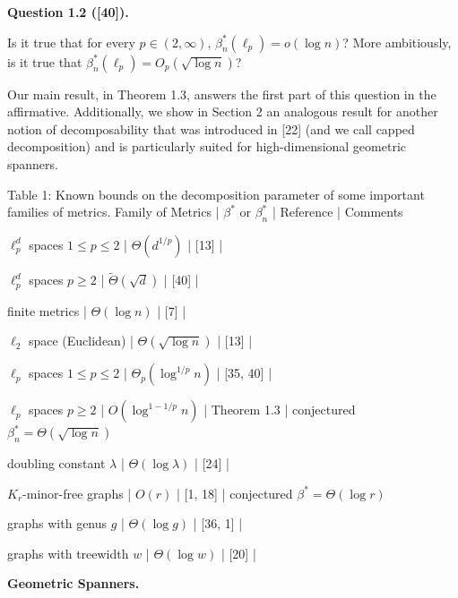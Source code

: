 \par
\par
\par\medskip\noindent\textbf{Question 1.2 ([40]).}\par
Is it true that for every $p\in(2,\infty)$, $\beta^{*}_{n}(\ell_{p})=o(\log{n})$? More ambitiously, is it true that $\beta^{*}_{n}(\ell_{p})=O_{p}(\sqrt{\log{n}})$?
\par
\par
\par
Our main result, in Theorem 1.3, answers the first part of this question in the affirmative. Additionally, we show in Section 2 an analogous result for another notion of decomposability that was introduced in [22] (and we call capped decomposition) and is particularly suited for high-dimensional geometric spanners.
\par
\par
 Table 1: Known bounds on the decomposition parameter of some important families of metrics. 
\noindent Family of Metrics |  $\beta^{*}$ or $\beta^{*}_{n}$  | Reference | Comments\par
\noindent  $\ell_{p}^{d}$ spaces $1\leq p\leq 2$  | $\Theta(d^{1/p})$ | [13] | \par
\noindent  $\ell_{p}^{d}$ spaces $p\geq 2$  | $\tilde{\Theta}(\sqrt{d})$ | [40] | \par
\noindent finite metrics | $\Theta(\log{n})$ | [7] | \par
\noindent  $\ell_{2}$ space (Euclidean) | $\Theta(\sqrt{\log{n}})$ | [13] | \par
\noindent  $\ell_{p}$ spaces $1\leq p\leq 2$  | $\Theta_{p}(\log^{1/p}{n})$ | [35, 40] | \par
\noindent  $\ell_{p}$ spaces $p\geq 2$  | $O(\log^{1-1/p}{n})$ | Theorem 1.3 | conjectured $\beta^{*}_{n}=\Theta(\sqrt{\log{n}})$ \par
\noindent doubling constant $\lambda$  | $\Theta(\log{\lambda})$ | [24] | \par
\noindent  $K_{r}$-minor-free graphs | $O(r)$ | [1, 18] | conjectured $\beta^{*}=\Theta(\log{r})$ \par
\noindent graphs with genus $g$  | $\Theta(\log{g})$ | [36, 1] | \par
\noindent graphs with treewidth $w$  | $\Theta(\log{w})$ | [20] | \par
\par\medskip\noindent\textbf{Geometric Spanners.}\par
